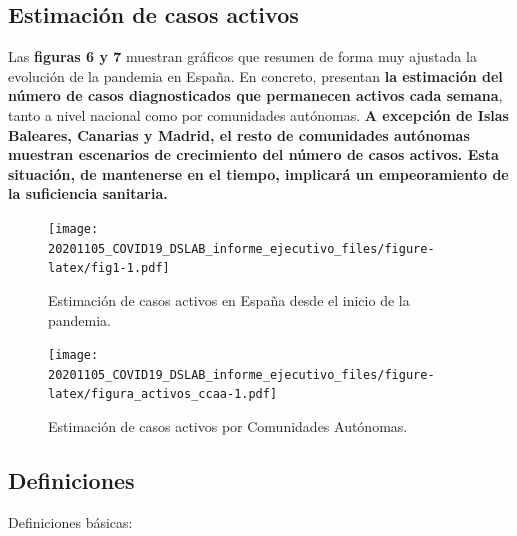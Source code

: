 \documentclass[
  11pt,
]{article}
\begin{document}
\clearpage

\hypertarget{estimaciuxf3n-de-casos-activos}{%
\subsection{Estimación de casos
activos}\label{estimaciuxf3n-de-casos-activos}}

Las \textbf{figuras 6 y 7} muestran gráficos que resumen de forma muy
ajustada la evolución de la pandemia en España. En concreto, presentan
\textbf{la estimación del número de casos diagnosticados que permanecen
activos cada semana}, tanto a nivel nacional como por comunidades
autónomas. \textbf{A excepción de Islas Baleares, Canarias y Madrid, el
resto de comunidades autónomas muestran escenarios de crecimiento del
número de casos activos. Esta situación, de mantenerse en el tiempo,
implicará un empeoramiento de la suficiencia sanitaria. }

\vspace{0.2cm}

\begin{figure}
\centering
\texttt{[image: 20201105\_COVID19\_DSLAB\_informe\_ejecutivo\_files/figure-latex/fig1-1.pdf]}
\caption{\label{fig:fig17a_res} Estimación de casos activos en España
desde el inicio de la pandemia.}
\end{figure}

\begin{figure}
\centering
\texttt{[image: 20201105\_COVID19\_DSLAB\_informe\_ejecutivo\_files/figure-latex/figura\_activos\_ccaa-1.pdf]}
\caption{\label{fig:figura_activos_ccaa} Estimación de casos activos por
Comunidades Autónomas.}
\end{figure}

\newpage

\hypertarget{definiciones}{%
\subsection{Definiciones}\label{definiciones}}

Definiciones básicas:
\end{document}
